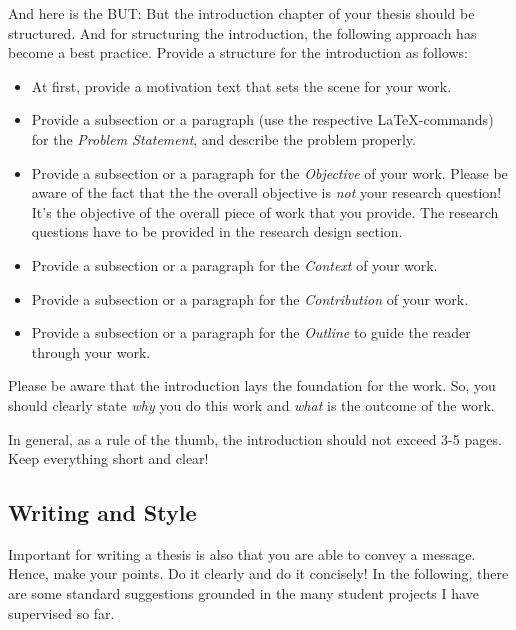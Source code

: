 And here is the BUT: But the introduction chapter of your thesis should be structured. And for structuring the introduction, the following approach has become a best practice. Provide a structure for the introduction as follows:
\begin{itemize}
	\item At first, provide a motivation text that sets the scene for your work.
	\item Provide a subsection or a paragraph (use the respective \LaTeX-commands) for the \emph{Problem Statement}, and describe the problem properly.
	\item Provide a subsection or a paragraph for the \emph{Objective} of your work. Please be aware of the fact that the the overall objective is \emph{not} your research question! It's the objective of the overall piece of work that you provide. The research questions have to be provided in the research design section.
	\item Provide a subsection or a paragraph for the \emph{Context} of your work.
	\item Provide a subsection or a paragraph for the \emph{Contribution} of your work.
	\item Provide a subsection or a paragraph for the \emph{Outline} to guide the reader through your work.
\end{itemize}
Please be aware that the introduction lays the foundation for the work. So, you should clearly state \emph{why} you do this work and \emph{what} is the outcome of the work.

\begin{MySugg}
	In general, as a rule of the thumb, the introduction should not exceed 3-5 pages. Keep everything short and clear!
\end{MySugg}

\subsection{Writing and Style}
\label{sec:03:ThesisStructure:WritingStyle}
Important for writing a thesis is also that you are able to convey a message. Hence, make your points. Do it clearly and do it concisely! In the following, there are some standard suggestions grounded in the many student projects I have supervised so far.

